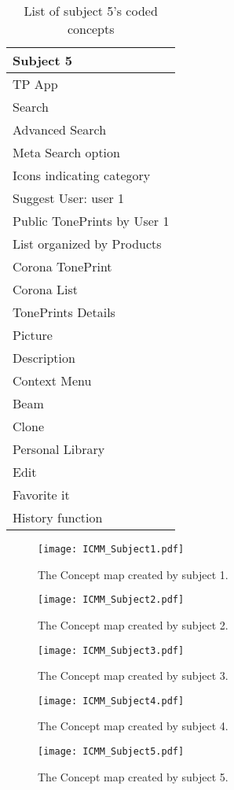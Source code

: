 \begin{table}[H]
\begin{minipage}[b]{0.49\linewidth}
	\begin{tabular}{|l|}
    \hline
    Subject 5 \\ \hline
    TP App \\
   	Search  \\
    Advanced Search  \\
    Meta Search option  \\
    Icons indicating category  \\
    Suggest User: user 1  \\
    Public TonePrints by User 1  \\
    List organized by Products  \\
    Corona TonePrint \\
    Corona List \\
    TonePrints Details \\
    Picture \\
    Description \\
    Context Menu \\
    Beam \\
    Clone \\
    Personal Library \\
    Edit \\
    Favorite it \\
    History function  \\ \hline
    \end{tabular}
	\caption{List of subject 5's coded concepts}
    \label{tab:Subject5Coded}
        
\end{minipage}
\end{table}






\begin{figure}[]
	\centering
	\texttt{[image: ICMM\_Subject1.pdf]}
	\caption{The Concept map created by subject 1.}
	\label{fig:ICMM1}
\end{figure}

\begin{figure}[]
	\centering
	\texttt{[image: ICMM\_Subject2.pdf]}
	\caption{The Concept map created by subject 2.}
	\label{fig:ICMM2}
\end{figure}

\begin{figure}[]
	\centering
	\texttt{[image: ICMM\_Subject3.pdf]}
	\caption{The Concept map created by subject 3.}
	\label{fig:ICMM3}
\end{figure}

\begin{figure}[]
	\centering
	\texttt{[image: ICMM\_Subject4.pdf]}
	\caption{The Concept map created by subject 4.}
	\label{fig:ICMM4}
\end{figure}

\begin{figure}[]
	\centering
	\texttt{[image: ICMM\_Subject5.pdf]}
	\caption{The Concept map created by subject 5.}
	\label{fig:ICMM5}
\end{figure}